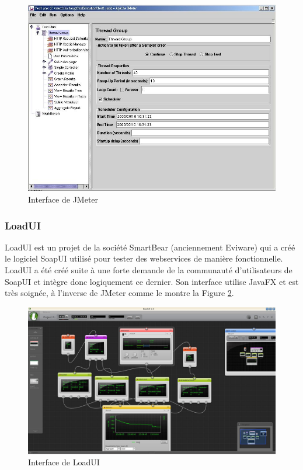 \begin{figure}[ht]
\begin{center}
\includegraphics[width=400pt]{img/jmeter.jpg}
\end{center}
\caption{Interface de JMeter}
\label{jmeter_scenario}
\end{figure}

\subsubsection{LoadUI}
LoadUI\cite{www_loadui} est un projet de la société SmartBear (anciennement Eviware) qui a créé le logiciel SoapUI\cite{www_soapui} utilisé pour tester des webservices de manière fonctionnelle. LoadUI a été créé suite à une forte demande de la communauté d'utilisateurs de SoapUI et intègre donc logiquement ce dernier. Son interface utilise JavaFX et est très soignée, à l'inverse de JMeter comme le montre la Figure \ref{loadui_ui}.

\begin{figure}[ht]
\begin{center}
\includegraphics[width=400pt]{img/loadui.jpg}
\end{center}
\caption{Interface de LoadUI}
\label{loadui_ui}
\end{figure}

